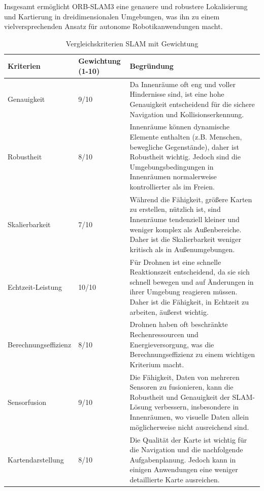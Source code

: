 Insgesamt ermöglicht ORB-SLAM3 eine genauere und robustere Lokalisierung und Kartierung in dreidimensionalen Umgebungen, was ihn zu einem vielversprechenden Ansatz für autonome Robotikanwendungen macht.

\begin{table}
    \begin{center}
        \begin{tabular}{|p{4cm}|p{1.5cm}|p{10cm}|}
            \hline
             Kriterien & Gewich\-tung (1-10) & Begründung \\\hline
             Genauigkeit & 9/10 & Da Innenräume oft eng und voller Hindernisse sind, ist eine hohe Genauigkeit entscheidend für die sichere Navigation und Kollisionserkennung. \\\hline
             Robustheit & 8/10 & Innenräume können dynamische Elemente enthalten (z.B. Menschen, bewegliche Gegenstände), daher ist Robustheit wichtig. Jedoch sind die Umgebungsbedingungen in Innenräumen normalerweise kontrollierter als im Freien. \\\hline
             Skalierbarkeit & 7/10 & Während die Fähigkeit, größere Karten zu erstellen, nützlich ist, sind Innenräume tendenziell kleiner und weniger komplex als Außenbereiche. Daher ist die Skalierbarkeit weniger kritisch als in Außenumgebungen.\\\hline
             Echtzeit-Leistung & 10/10 & Für Drohnen ist eine schnelle Reaktionszeit entscheidend, da sie sich schnell bewegen und auf Änderungen in ihrer Umgebung reagieren müssen. Daher ist die Fähigkeit, in Echtzeit zu arbeiten, äußerst wichtig.\\\hline
             Berechnungseffizienz & 8/10 & Drohnen haben oft beschränkte Rechenressourcen und Energieversorgung, was die Berechnungseffizienz zu einem wichtigen Kriterium macht. \\\hline
             Sensorfusion & 9/10 & Die Fähigkeit, Daten von mehreren Sensoren zu fusionieren, kann die Robustheit und Genauigkeit der SLAM-Lösung verbessern, insbesondere in Innenräumen, wo visuelle Daten allein möglicherweise nicht ausreichend sind. \\\hline
             Kartendarstellung & 8/10 & Die Qualität der Karte ist wichtig für die Navigation und die nachfolgende Aufgabenplanung. Jedoch kann in einigen Anwendungen eine weniger detaillierte Karte ausreichen. \\
             \hline
        \end{tabular}
        \caption{Vergleichskriterien \ac{SLAM} mit Gewichtung}\label{tab:vergleich-slam-gewichtung}
    \end{center}
\end{table}


